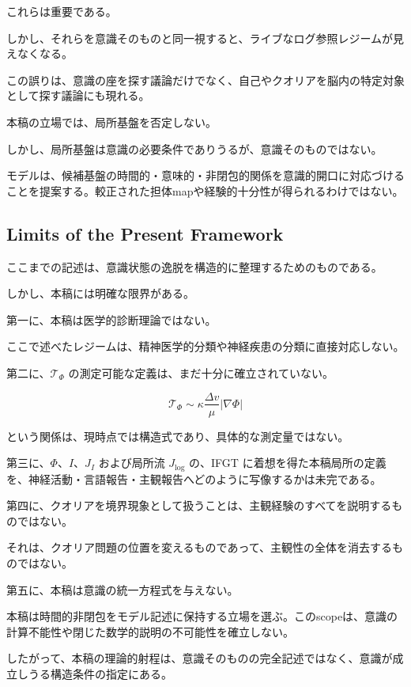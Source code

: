 これらは重要である。

しかし、それらを意識そのものと同一視すると、ライブなログ参照レジームが見えなくなる。

この誤りは、意識の座を探す議論だけでなく、自己やクオリアを脳内の特定対象として探す議論にも現れる。

本稿の立場では、局所基盤を否定しない。

しかし、局所基盤は意識の必要条件でありうるが、意識そのものではない。

モデルは、候補基盤の時間的・意味的・非閉包的関係を意識的開口に対応づけることを提案する。較正された担体mapや経験的十分性が得られるわけではない。

\subsection{Limits of the Present Framework}

ここまでの記述は、意識状態の逸脱を構造的に整理するためのものである。

しかし、本稿には明確な限界がある。

第一に、本稿は医学的診断理論ではない。

ここで述べたレジームは、精神医学的分類や神経疾患の分類に直接対応しない。

第二に、$\mathcal{T}_{\Phi}$ の測定可能な定義は、まだ十分に確立されていない。

\begin{equation}
\mathcal{T}_{\Phi}
\sim
\kappa
\frac{\Delta v}{\mu}
|\nabla \Phi|
\end{equation}

という関係は、現時点では構造式であり、具体的な測定量ではない。

第三に、$\Phi$、$I$、$J_I$ および局所流 $J_{\log}$ の、IFGT に着想を得た本稿局所の定義を、神経活動・言語報告・主観報告へどのように写像するかは未完である。

第四に、クオリアを境界現象として扱うことは、主観経験のすべてを説明するものではない。

それは、クオリア問題の位置を変えるものであって、主観性の全体を消去するものではない。

第五に、本稿は意識の統一方程式を与えない。

本稿は時間的非閉包をモデル記述に保持する立場を選ぶ。このscopeは、意識の計算不能性や閉じた数学的説明の不可能性を確立しない。

したがって、本稿の理論的射程は、意識そのものの完全記述ではなく、意識が成立しうる構造条件の指定にある。

